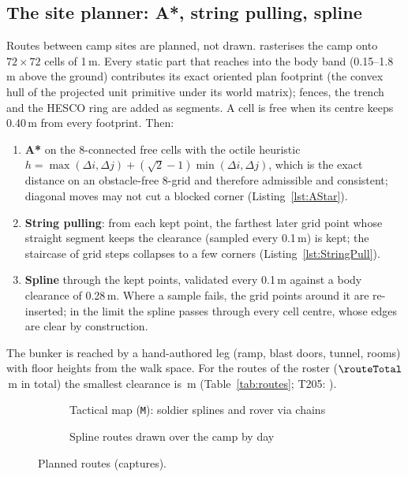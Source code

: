\subsection{The site planner: A*, string pulling, spline}
Routes between camp sites are planned, not drawn.  rasterises the camp onto $72\times72$ cells of 1\,m. Every static part that reaches into the body band (0.15--1.8\,m above the ground) contributes its exact oriented plan footprint (the convex hull of the projected unit primitive under its world matrix); fences, the trench and the HESCO ring are added as segments. A cell is free when its centre keeps 0.40\,m from every footprint. Then:
\begin{enumerate}
\item \textbf{A*} on the 8-connected free cells with the octile heuristic $h=\max(\Delta i,\Delta j)+(\sqrt2-1)\min(\Delta i,\Delta j)$, which is the exact distance on an obstacle-free 8-grid and therefore admissible and consistent; diagonal moves may not cut a blocked corner (Listing~\ref{lst:AStar}).
\item \textbf{String pulling}: from each kept point, the farthest later grid point whose straight segment keeps the clearance (sampled every 0.1\,m) is kept; the staircase of grid steps collapses to a few corners (Listing~\ref{lst:StringPull}).
\item \textbf{Spline} through the kept points, validated every 0.1\,m against a body clearance of 0.28\,m. Where a sample fails, the grid points around it are re-inserted; in the limit the spline passes through every cell centre, whose edges are clear by construction.
\end{enumerate}
The bunker is reached by a hand-authored leg (ramp, blast doors, tunnel, rooms) with floor heights from the walk space. For the \nRoutes{} routes of the roster ($\routeTotal$\,m in total) the smallest clearance is \routeMinClear\,m (Table~\ref{tab:routes}; T205: ).
\begin{figure}[h]
\centering
\begin{subfigure}{0.495\linewidth}\caption{Tactical map (\texttt{M}): soldier splines and rover via chains}\end{subfigure}
\begin{subfigure}{0.495\linewidth}\caption{Spline routes drawn over the camp by day}\end{subfigure}
\caption{Planned routes (captures).}\label{fig:routes}
\end{figure}
\lstAStar
\lstStringPull
\begin{table}[h]
\centering\scriptsize
\caption{Roster routes (generated from ).}\label{tab:routes}
\tabRoutes
\end{table}

